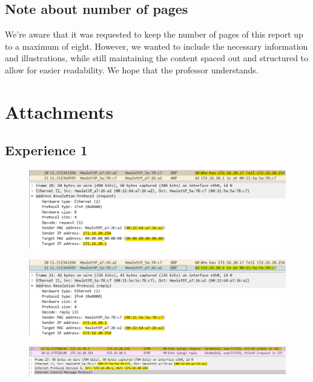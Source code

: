 \documentclass[11pt]{report}
\begin{document}
\section{Note about number of pages}
We're aware that it was requested to keep the number of pages of this report up to a maximum of eight. However, we wanted to include the necessary information and illustrations, while still maintaining the content spaced out and structured to allow for easier readability. 
We hope that the professor understands.

\chapter{Attachments}

\section{Experience 1}

\begin{figure}[h!]
    \centering
    \includegraphics[width=\textwidth]{images/Experience1_1.png}
    \caption{}
    \label{fig:experience1_1}
\end{figure}

\begin{figure}[h!]
    \centering
    \includegraphics[width=\textwidth]{images/Experience1_2.png}
    \caption{}
    \label{fig:experience1_2}
\end{figure}

\begin{figure}[h!]
    \centering
    \includegraphics[width=\textwidth]{images/Experience1_3.png}
    \caption{}
    \label{fig:experience1_3}
\end{figure}
\end{document}
